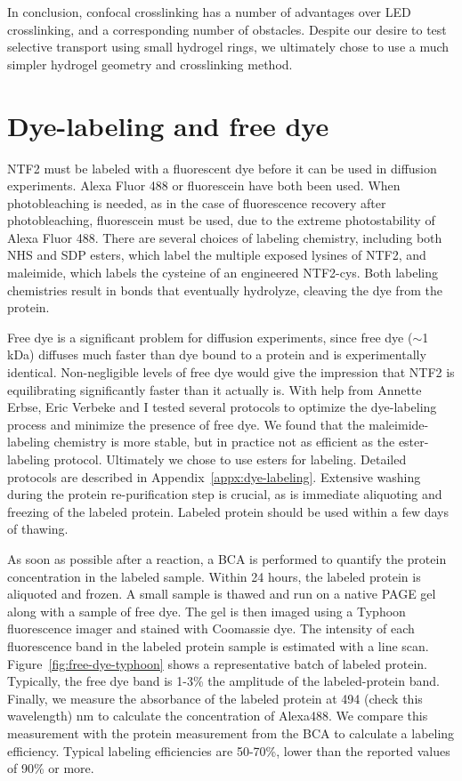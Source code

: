 In conclusion, confocal crosslinking has a number of advantages over LED crosslinking, and a corresponding number of obstacles.  Despite our desire to test selective transport using small hydrogel rings, we ultimately chose to use a much simpler hydrogel geometry and crosslinking method.

\section{Dye-labeling and free dye}
\label{sec:free-dye}

NTF2 must be labeled with a fluorescent dye before it can be used in diffusion experiments.  Alexa Fluor 488 or fluorescein have both been used.  When photobleaching is needed, as in the case of fluorescence recovery after photobleaching, fluorescein must be used, due to the extreme photostability of Alexa Fluor 488.  There are several choices of labeling chemistry, including both NHS and SDP esters, which label the multiple exposed lysines of NTF2, and maleimide, which labels the cysteine of an engineered NTF2-cys.  Both labeling chemistries result in bonds that eventually hydrolyze, cleaving the dye from the protein. 

Free dye is a significant problem for diffusion experiments, since free dye ($\sim$1 kDa) diffuses much faster than dye bound to a protein and is experimentally identical.  Non-negligible levels of free dye would give the impression that NTF2 is equilibrating significantly faster than it actually is.  With help from Annette Erbse, Eric Verbeke and I tested several protocols to optimize the dye-labeling process and minimize the presence of free dye.  We found that the maleimide-labeling chemistry is more stable, but in practice not as efficient as the ester-labeling protocol.  Ultimately we chose to use esters for labeling.  Detailed protocols are described in Appendix~\ref{appx:dye-labeling}.  Extensive washing during the protein re-purification step is crucial, as is immediate aliquoting and freezing of the labeled protein.  Labeled protein should be used within a few days of thawing.

As soon as possible after a reaction, a BCA is performed to quantify the protein concentration in the labeled sample.  Within 24 hours, the labeled protein is aliquoted and frozen.  A small sample is thawed and run on a native PAGE gel along with a sample of free dye.  The gel is then imaged using a Typhoon fluorescence imager and stained with Coomassie dye.  The intensity of each fluorescence band in the labeled protein sample is estimated with a line scan.  Figure~\ref{fig:free-dye-typhoon} shows a representative batch of labeled protein.  Typically, the free dye band is 1-3\% the amplitude of the labeled-protein band.  Finally, we measure the absorbance of the labeled protein at 494 (check this wavelength) nm to calculate the concentration of Alexa488.  We compare this measurement with the protein measurement from the BCA to calculate a labeling efficiency.  Typical labeling efficiencies are 50-70\%, lower than the reported values of 90\% or more.

